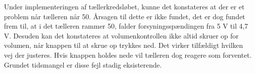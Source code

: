 Under implementeringen af tællerkredsløbet, kunne det konstateres at der er et problem når tælleren når 50. Årsagen til dette er ikke fundet, det er dog fundet frem til, at i det tælleren rammer 50, falder forsyningsspændingen fra 5 V til 4,7 V. Desuden kan det konstateres at volumenkontrollen ikke altid skruer op for volumen, når knappen til at skrue op trykkes ned. Det virker tilfældigt hvilken vej der justeres. Hvis knappen holdes nede vil tælleren dog reagere som forventet. Grundet tidsmangel er disse fejl stadig eksisterende.